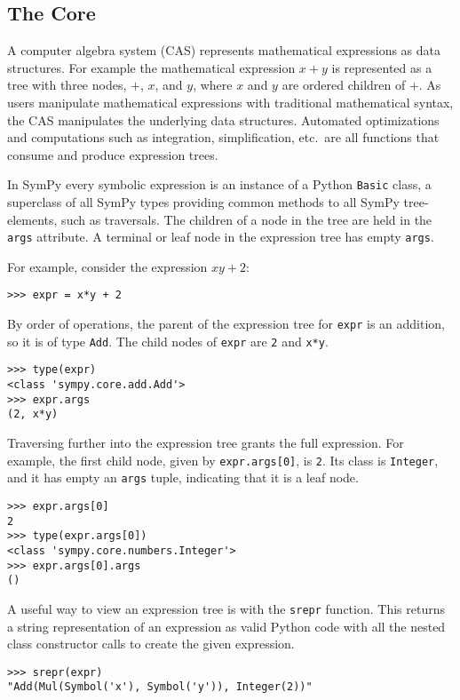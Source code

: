 \subsection{The Core}

A computer algebra system (CAS) represents mathematical expressions as data
structures.  For example the mathematical expression $x + y$ is represented as
a tree with three nodes, $+$, $x$, and $y$, where $x$ and $y$ are ordered
children of $+$.  As users manipulate
mathematical expressions with traditional mathematical syntax, the CAS
manipulates the underlying data structures.  Automated optimizations and
computations such as integration, simplification, etc.\ are all functions that
consume and produce expression trees.

In SymPy every symbolic expression is an instance of a Python \texttt{Basic}
class, a superclass of all SymPy types providing common methods to all SymPy
tree-elements, such as traversals.  The children of a node in the
tree are held in the \texttt{args} attribute.  A terminal or leaf node in the
expression tree has empty \texttt{args}.

For example, consider the expression $xy + 2$:
\begin{verbatim}
>>> expr = x*y + 2
\end{verbatim}
By order of operations, the parent of the expression tree for \texttt{expr} is
an addition, so it is of type \texttt{Add}. The child nodes of \texttt{expr} are
\texttt{2} and \texttt{x*y}.
\begin{verbatim}
>>> type(expr)
<class 'sympy.core.add.Add'>
>>> expr.args
(2, x*y)
\end{verbatim}

Traversing further into the expression tree grants the full expression. For
example, the first child node, given by \texttt{expr.args[0]}, is
\texttt{2}. Its class is \texttt{Integer}, and it has empty an \texttt{args}
tuple, indicating that it is a leaf node.
\begin{verbatim}
>>> expr.args[0]
2
>>> type(expr.args[0])
<class 'sympy.core.numbers.Integer'>
>>> expr.args[0].args
()
\end{verbatim}

A useful way to view an expression tree is with the \texttt{srepr} function.
This returns a string representation of an expression as valid Python code
with all the nested class constructor calls to create the given expression.
\begin{verbatim}
>>> srepr(expr)
"Add(Mul(Symbol('x'), Symbol('y')), Integer(2))"
\end{verbatim}

